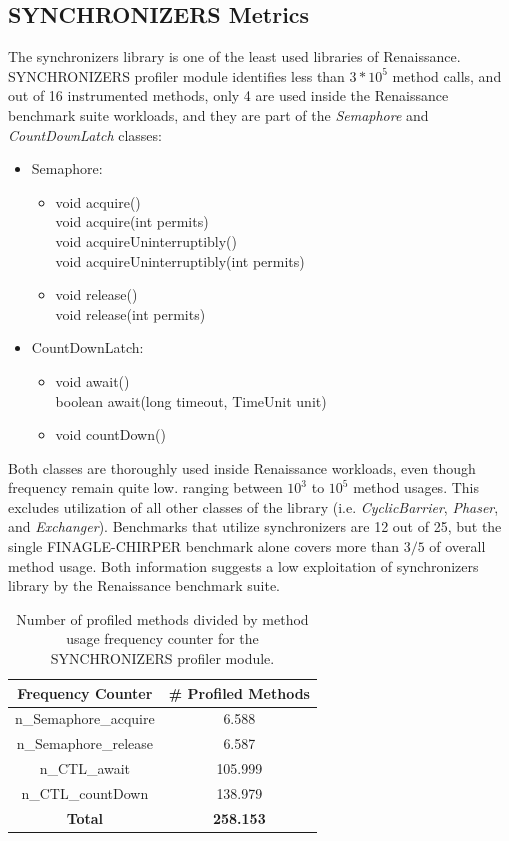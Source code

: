 \documentclass[]{usiinfthesis}
\begin{document}
 \subsection{SYNCHRONIZERS Metrics}
The synchronizers library is one of the least used libraries of Renaissance. SYNCHRONIZERS profiler module identifies less than \(3*10^5\) method calls, and out of 16 instrumented methods, only 4 are used inside the Renaissance benchmark suite workloads, and they are part of the \textit{Semaphore} and \textit{CountDownLatch} classes:
\begin{itemize}
    \item Semaphore:
    \begin{itemize}
        \item   void acquire()
        \mbox{}\\ void acquire(int permits)
        \mbox{}\\ void acquireUninterruptibly()
        \mbox{}\\ void acquireUninterruptibly(int permits)
        \item   void release()
        \mbox{}\\ void release(int permits)
        \end{itemize}
    \item CountDownLatch:
        \begin{itemize}
        \item   void await()
        \mbox{}\\ boolean await(long timeout, TimeUnit unit)
        \item   void countDown()
        \end{itemize}
\end{itemize}
Both classes are thoroughly used inside Renaissance workloads, even though frequency remain quite low. ranging between \(10^3\) to \(10^5\) method usages. This excludes utilization of all other classes of the library (i.e. \textit{CyclicBarrier}, \textit{Phaser}, and \textit{Exchanger}). Benchmarks that utilize synchronizers are 12 out of 25, but the single FINAGLE-CHIRPER benchmark alone covers more than \(3/5\) of overall method usage. Both information suggests a low exploitation of synchronizers library by the Renaissance benchmark suite.

\begin{table}
\centering
\caption{Number of profiled methods divided by method usage frequency counter for the SYNCHRONIZERS profiler module.}
\begin{tabular}{|c|c|}
\hline
\textbf{Frequency Counter} & \textbf{# Profiled Methods} \\
\hline
n\_Semaphore\_acquire	&	 6.588 	 \\ 
n\_Semaphore\_release	&	 6.587 	 \\ 
n\_CTL\_await	&	 105.999 	 \\ 
n\_CTL\_countDown	&	 138.979 	 \\ 
\hline			
\hline			
\textbf{Total}	&  \textbf{	 258.153 	 }\\ 
\hline			
\end{tabular}
\end{table}%
\end{document}
